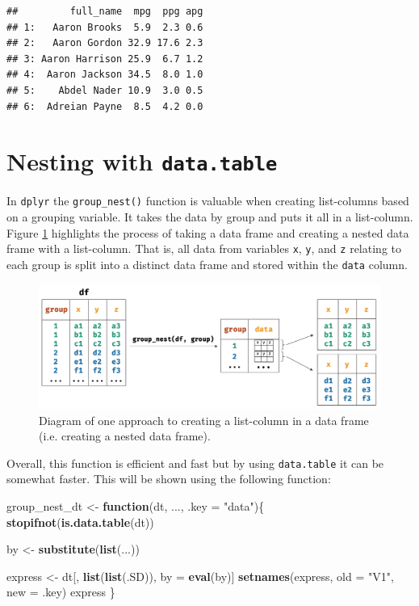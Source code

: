 \documentclass[doc,floatsintext]{apa6}
\newenvironment{Shaded}{\begin{snugshade}}{\end{snugshade}}
\newcommand{\ControlFlowTok}[1]{\textcolor[rgb]{0.13,0.29,0.53}{\textbf{#1}}}
\newcommand{\DataTypeTok}[1]{\textcolor[rgb]{0.13,0.29,0.53}{#1}}
\newcommand{\KeywordTok}[1]{\textcolor[rgb]{0.13,0.29,0.53}{\textbf{#1}}}
\newcommand{\NormalTok}[1]{#1}
\newcommand{\StringTok}[1]{\textcolor[rgb]{0.31,0.60,0.02}{#1}}
\begin{document}
\begin{verbatim}
##         full_name  mpg  ppg apg
## 1:   Aaron Brooks  5.9  2.3 0.6
## 2:   Aaron Gordon 32.9 17.6 2.3
## 3: Aaron Harrison 25.9  6.7 1.2
## 4:  Aaron Jackson 34.5  8.0 1.0
## 5:    Abdel Nader 10.9  3.0 0.5
## 6:  Adreian Payne  8.5  4.2 0.0
\end{verbatim}

\hypertarget{nesting-with-data.table}{%
\section{\texorpdfstring{Nesting with \texttt{data.table}}{Nesting with data.table}}\label{nesting-with-data.table}}

In \texttt{dplyr} the \texttt{group\_nest()} function is valuable when creating list-columns based on a grouping variable. It takes the data by group and puts it all in a list-column. Figure \ref{process} highlights the process of taking a data frame and creating a nested data frame with a list-column. That is, all data from variables \texttt{x}, \texttt{y}, and \texttt{z} relating to each group is split into a distinct data frame and stored within the \texttt{data} column.

\begin{figure}[tb]
  \centering
  \includegraphics[width=\textwidth]{fig_process.png}
  \caption{Diagram of one approach to creating a list-column in a data frame (i.e. creating a nested data frame).}
  \label{process}
\end{figure}

Overall, this function is efficient and fast but by using \texttt{data.table} it can be somewhat faster. This will be shown using the following function:

\begin{Shaded}
\begin{Highlighting}[]
\NormalTok{group_nest_dt <-}\StringTok{ }\ControlFlowTok{function}\NormalTok{(dt, ..., }\DataTypeTok{.key =} \StringTok{"data"}\NormalTok{)\{}
  \KeywordTok{stopifnot}\NormalTok{(}\KeywordTok{is.data.table}\NormalTok{(dt))}

\NormalTok{  by <-}\StringTok{ }\KeywordTok{substitute}\NormalTok{(}\KeywordTok{list}\NormalTok{(...))}
  
\NormalTok{  express <-}\StringTok{ }\NormalTok{dt[, }\KeywordTok{list}\NormalTok{(}\KeywordTok{list}\NormalTok{(.SD)), by =}\StringTok{ }\KeywordTok{eval}\NormalTok{(by)]}
  \KeywordTok{setnames}\NormalTok{(express, }\DataTypeTok{old =} \StringTok{"V1"}\NormalTok{, }\DataTypeTok{new =}\NormalTok{ .key)}
\NormalTok{  express}
\NormalTok{\}}
\end{Highlighting}
\end{Shaded}
\end{document}
